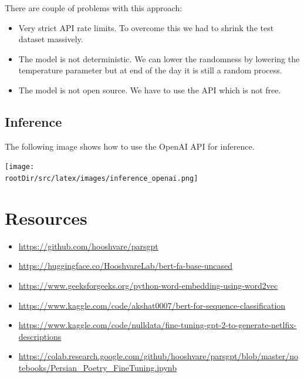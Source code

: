 \documentclass[12pt, letterpaper]{article}
\def\rootDir{../..}
\begin{document}
    There are couple of problems with this approach:
    \begin{itemize}
        \item Very strict API rate limits. To overcome this we had to shrink the test dataset massively.
        \item The model is not deterministic. We can lower the randomness by lowering the temperature parameter but at end of the day it is still a random process.
        \item The model is not open source. We have to use the API which is not free.
    \end{itemize}

    \subsection{Inference}\label{subsec:inference-openai}
    The following image shows how to use the OpenAI API for inference.
    \begin{center}
        \texttt{[image: \\rootDir/src/latex/images/inference\_openai.png]}
    \end{center}

    \section{Resources}\label{sec:resources}
    \begin{itemize}
    \item \url{https://github.com/hooshvare/parsgpt}
    \item \url{https://huggingface.co/HooshvareLab/bert-fa-base-uncased}
    \item \url{https://www.geeksforgeeks.org/python-word-embedding-using-word2vec}
    \item \url{https://www.kaggle.com/code/akshat0007/bert-for-sequence-classification}
    \item \url{https://www.kaggle.com/code/nulldata/fine-tuning-gpt-2-to-generate-netlfix-descriptions}
    \item \url{https://colab.research.google.com/github/hooshvare/parsgpt/blob/master/notebooks/Persian_Poetry_FineTuning.ipynb}
    \end{itemize}
\end{document}
